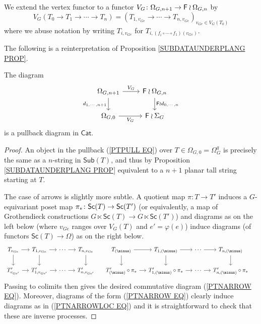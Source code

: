 \documentclass[a4paper,10pt]{article}%
\begin{document}
\begin{notation}
We extend the vertex functor to a functor 
$V_G \colon \Omega_{G,n+1} \to \mathsf{F} \wr \Omega_{G,n}$
by
\begin{equation}\label{VGDEF EQ}
	V_G(T_0 \to T_1 \to \cdots \to T_n) = 
	(T_{1,v_{Ge}} \to \cdots \to
	T_{n,v_{Ge}})_{v_{Ge} \in V_G(T_0)}	
\end{equation}
where we abuse notation by writing $T_{i,v_{Ge}}$
for $T_{i, (f_i\circ \cdots \circ f_1)(v_{Ge})}$.
\end{notation}


The following is a reinterpretation of Proposition \ref{SUBDATAUNDERPLANG PROP}.

\begin{proposition} \label{SUBSASPULL PROP}
The diagram
	\begin{equation}\label{PTPULL EQ}
	\begin{tikzcd}
		\Omega_{G,n+1} \ar{r}{V_G} 
		\ar{d}[swap]{d_{1,\cdots,n+1}} & \Fin \wr \Omega_{G,n} 
		\ar{d}{\Fin \wr d_{0,\cdots,n}}
	\\
		\Omega_{G,0} \ar{r}[swap]{V_G} & \Fin \wr \Sigma_G
	\end{tikzcd}
	\end{equation}
is a pullback diagram in $\mathsf{Cat}$.
\end{proposition}


\begin{proof}
	An object in the pullback (\ref{PTPULL EQ}) over 
	$T\in \Omega_{G,0} = \Omega_G^q$ is precisely the same as a $n$-string in $\mathsf{Sub}(T)$, and thus by Proposition \ref{SUBDATAUNDERPLANG PROP} equivalent to a $n+1$ planar tall string starting at $T$.
	
	The case of arrows is slightly more subtle. A quotient map $\pi \colon T \to T'$ induces a $G$-equivariant poset map 
	$\pi_{\**} \colon \mathsf{Sc}(T) \to \mathsf{Sc}(T')$ 
	(or equivalently, a map of Grothendieck constructions 
	$G \ltimes \mathsf{Sc}(T) \to G \ltimes \mathsf{Sc}(T')$)
	and diagrams as on the left below (where $v_{Ge}$ ranges over $V_G(T)$ and $e'=\varphi(e)$) induce diagrams (of functors $\mathsf{Sc}(T) \to \Omega$) as on the right below.
	\begin{equation} \label{PTNARROWLOC EQ}
	\begin{tikzcd}[column sep=1.2em]
	T_{v_{G e}} \ar{r}{} \ar{d}[swap]{} & 
	T_{1,v_{G e}} \ar{r}{} \ar{d}[swap]{} &
	\cdots \ar{r}{} &
	T_{n,v_{G e}} \ar{d}{} &
	T_{(\minus)} \ar{r}{} \ar{d}[swap]{} & 
	T_{1,(\minus)} \ar{r}{} \ar{d}[swap]{} &
	\cdots \ar{r}{} &
	T_{n,(\minus)} \ar{d}{} &
\\
	T'_{v_{G e'}} \ar{r}{} &
	T'_{1,v_{G e'}} \ar{r}{} &
	\cdots \ar{r}{} &
	T'_{n,v_{G e'}} &
	T'_{(\minus)}\circ \pi_{\**} \ar{r}{} &
	T'_{1,(\minus)}\circ \pi_{\**} \ar{r}{} &
	\cdots \ar{r}{} &
	T'_{n,(\minus)}\circ \pi_{\**} &
	\end{tikzcd}	
	\end{equation}
Passing to colimits then gives the desired commutative diagram (\ref{PTNARROW EQ}). Moreover, diagrams of the form (\ref{PTNARROW EQ}) clearly induce diagrams as in  (\ref{PTNARROWLOC EQ}) and it is straightforward to check that these are inverse processes. 
\end{proof}
\end{document}
